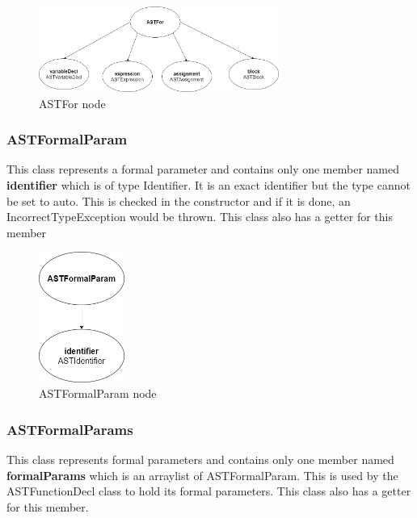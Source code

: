 \documentclass{article}
\begin{document}
					\begin{figure}[H]
					\centering
			 			\includegraphics[width=0.7\textwidth]{astfor.png}
			  			\caption{{ASTFor} node}
			  			\label{fig:astfor}
					\end{figure}	 
					
					\subsubsection{ASTFormalParam}
					
					This class represents a formal parameter and contains only one member named \textbf{identifier} which is of type Identifier. It is an exact identifier but the type cannot be set to auto. This is checked in the constructor and if it is done, an IncorrectTypeException would be thrown. This class also has a getter for this member
					
					\begin{figure}[H]
					\centering
			 			\includegraphics[width=0.25\textwidth]{astformalparam.png}
			  			\caption{{ASTFormalParam} node}
			  			\label{fig:astformalparam}
					\end{figure}	 
					
					\subsubsection{ASTFormalParams}
					
					This class represents formal parameters and contains only one member named \textbf{formalParams} which is an arraylist of ASTFormalParam. This is used by the ASTFunctionDecl class to hold its formal parameters. This class also has a getter for this member.
					
\end{document}
